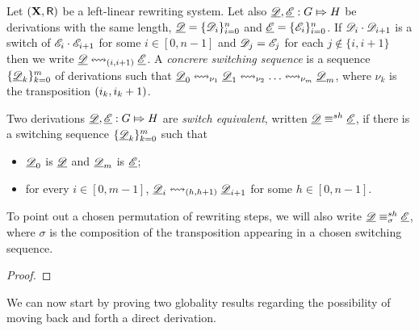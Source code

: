 \begin{definition}
	\label{de:switch-equivalence}
	Let $(\textbf {\textup{X}}, \mathsf{R})$ be a left-linear rewriting system.  Let also
	$\underline{\mathscr{D}}, \underline{\mathscr{E}} : G \Mapsto H$ be derivations with the same
	length, $\underline{\mathscr{D}}=\{\mathscr{D}_{i}\}_{i=0}^n$ and
	$\underline{\mathscr{E}}=\{\mathscr{E}_{i}\}_{i=0}^n$. If
	$\mathscr{D}_i \cdot \mathscr{D}_{i+1}$ is a switch of
	$\mathscr{E}_i \cdot \mathscr{E}_{i+1}$ for some $i \in [0,n-1]$ and  $\mathscr{D}_j = \mathscr{E}_j$ for each $j \not \in \{i,i+1\}$ then we write
	$\der{D} \shift{\transp{i}} \der{E}$. 
	A \emph{concrere switching sequence} is a sequence $\{\underline{\mathscr{D}}_{k}\}_{k=0}^m$
	of derivations such that
	$\underline{\mathscr{D}}_0 \mathrel{{\leftrightsquigarrow}_{\nu_1}} \underline{\mathscr{D}}_1 \mathrel{{\leftrightsquigarrow}_{\nu_2}} \ldots
	\mathrel{{\leftrightsquigarrow}_{\nu_m}} \underline{\mathscr{D}}_m$, where $\nu_{k}$ is the transposition $\transp{i_k}$.
	
		
	Two derivations $\underline{\mathscr{D}}, \underline{\mathscr{E}}:G\Mapsto H$ are \emph{switch
		equivalent}, written $\underline{\mathscr{D}}\equiv^{sh} \underline{\mathscr{E}}$, if there is a
	switching sequence $\{\underline{\mathscr{D}}_{k}\}_{k=0}^m$ such that
	\begin{itemize}
		\item $\underline{\mathscr{D}}_0$ is $\underline{\mathscr{D}}$ and $\underline{\mathscr{D}}_m$ is $\underline{\mathscr{E}}$;
		\item for every $i\in [0,m-1]$, $\der{D}_i \shift{\transp{h}}\der{D}_{i+1}$ for some $h\in [0, n-1]$.
	\end{itemize}
	 
	To point out a chosen permutation of rewriting steps, we will also write $\underline{\mathscr{D}}\equiv^{sh}_{\sigma} \underline{\mathscr{E}}$, 
	where $\sigma$ is the composition of the transposition appearing in a chosen switching sequence. 
\end{definition}


\begin{proposition}
\end{proposition}
\begin{proof}
	
	
\end{proof}

We can now  start by proving two globality results regarding the possibility of moving back and forth a direct derivation.


